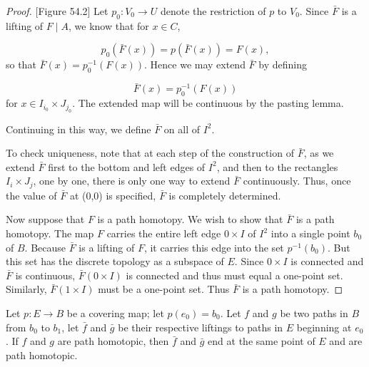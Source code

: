 \begin{proof}
[Figure 54.2]
Let \(p_{0} : V_{0} \rightarrow U\) denote the restriction of \(p\) to \(V_{0}\). Since \(\bar{F}\) is a lifting of \(F \mid A\), we know that for \(x \in C\),

\[
p_{0}( {\bar{F}(x) }) = p( {\bar{F}(x) }) = F(x),
\]
so that \(\bar{F}(x) = p_0^{-1}( {F(x) })\). Hence we may extend \(\bar{F}\) by defining

\[
\bar{F}(x) = p_0^{-1}( {F(x) })
\]
for \(x \in {I}_{i_{0}} \times {J}_{j_{0}}\). The extended map will be continuous by the pasting lemma.

Continuing in this way, we define \(\bar{F}\) on all of \(I^{2}\).

To check uniqueness, note that at each step of the construction of \(\bar{F}\), as we extend \(\bar{F}\) first to the bottom and left edges of \(I^{2}\), and then to the rectangles \(I_{i} \times {J}_{j}\), one by one, there is only one way to extend \(\bar{F}\) continuously. Thus, once the value of \(\bar{F}\) at (0,0) is specified, \(\bar{F}\) is completely determined.

Now suppose that \(F\) is a path homotopy. We wish to show that \(\bar{F}\) is a path homotopy. The map \(F\) carries the entire left edge \(0 \times I\) of \(I^{2}\) into a single point \(b_{0}\) of \(B\). Because \(\bar{F}\) is a lifting of \(F\), it carries this edge into the set \(p^{-1}( b_{0})\). But this set has the discrete topology as a subspace of \(E\). Since \(0 \times I\) is connected and \(\bar{F}\) is continuous, \(\bar{F}( {0 \times I})\) is connected and thus must equal a one-point set. Similarly, \(\bar{F}( {1 \times I})\) must be a one-point set. Thus \(\bar{F}\) is a path homotopy.
\end{proof}
\begin{theorem}
\label{thm:\thetheorem}
Let \(p : E \rightarrow B\) be a covering map; let \(p( e_{0}) = b_{0}\). Let \(f\) and \(g\) be two paths in \(B\) from \(b_{0}\) to \(b_{1}\), let \(\bar{f}\) and \(\bar{g}\) be their respective liftings to paths in \(E\) beginning at \(e_{0}\). If \(f\) and \(g\) are path homotopic, then \(\bar{f}\) and \(\bar{g}\) end at the same point of \(E\) and are path homotopic.
\end{theorem}
